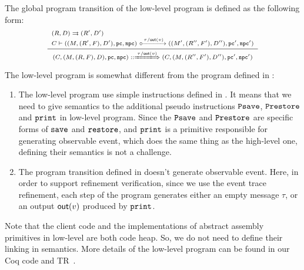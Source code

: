 The global program transition of the low-level \sparc{} program is defined
as the following form:
\[
    \scriptsize
    \infer
    {
        \LGlobTrans{(\code, (\Mem, (\RFile, \Wstack), \DBuf), \pc, \npc)}
            { \empmsg / \outEvt{\val} }
            {(\code, (\Mem, (\RFile'', \Wstack'), \DBuf''), \pc', \npc')}
    }
    {
        \begin{array}{l}
            \Dstep{(\RFile, \DBuf)}{(\RFile', \DBuf')} \\
            \llocalstep{\code}
                {((\Mem, (\RFile', \Wstack), \DBuf'), \pc, \npc)}
                { \empmsg / \outEvt{\val} }
                {((\Mem', (\RFile'', \Wstack'), \DBuf''), \pc', \npc')}
        \end{array}
    }
\]
{\color{blue}
The low-level \sparc{} program is somewhat different
from the \sparc{} program defined in
\Sec{\ref{sec:modeling}}:
\begin{enumerate}
    \item The low-level \sparc{} program use simple
        instructions defined in
        \Fig{\ref{fig:syntax-of-concur-pseudo-sparc}}.
        It means that we need to give semantics to the additional
        pseudo instructions $\texttt{Psave}$, $\texttt{Prestore}$ and
        $\texttt{print}$ in low-level \sparc{} program.
        Since the $\texttt{Psave}$ and $\texttt{Prestore}$
        are specific forms of $\texttt{save}{}$ and
        $\texttt{restore}{}$, and $\texttt{print}$ is a primitive
        responsible for generating observable event,
        which does the same thing as the high-level one,
        defining their semantics is not a challenge.
    \item The program transition defined in
        \Sec{\ref{sec:modeling}} doesn't generate
        observable event. Here, in order to support
        refinement verification,
        since we use the event trace refinement,
        each step of the program
        generates either an empty message $\tau$,
        or an output $\textsf{out}({v})$ produced
        by $\texttt{print}$.
\end{enumerate}
}
{\color{blue} Note that the client
code and the implementations of abstract assembly primitives
in low-level are both \sparc{} code heap. So, we do not need
to define their linking in semantics.}
More details of the low-level program can be found in
our Coq code and TR~\cite{coqimp}.


